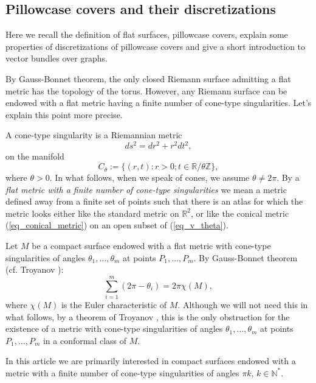 \documentclass[12pt]{article}
\numberwithin{equation}{section}
\theoremstyle{theorem}
\theoremstyle{definition}
\theoremstyle{remark}
\newcommand{\real}{\mathbb{R}}
\newcommand{\nat}{\mathbb{N}}
\newcommand{\integ}{\mathbb{Z}}
\begin{document}
		\subsection{Pillowcase covers and their discretizations}\label{sect_sq_t_s_disc}
	\par Here we recall the definition of flat surfaces, pillowcase covers, explain some properties of discretizations of pillowcase covers and give a short introduction to vector bundles over graphs.
	\par 
	By Gauss-Bonnet theorem, the only closed Riemann surface admitting a flat metric has the topology of the torus. 
	However, any Riemann surface can be endowed with a flat metric having a finite number of cone-type singularities. 
	Let's explain this point more precise.
	\par 
	A cone-type singularity is a Riemannian metric
	\begin{equation}\label{eq_conical_metric}
		ds^2 = dr^2 + r^2 dt^2,
	\end{equation}
	on the manifold
	\begin{equation}\label{eq_v_theta}
		C_{\theta} := \{(r, t) : r > 0; t \in \real / \theta \integ \},
	\end{equation}
	where $\theta > 0$.
	In what follows, when we speak of cones, we assume $\theta \neq 2\pi$.
	By a \textit{flat metric with a finite number of cone-type singularities} we mean a metric defined away from a finite set of points such that there is an atlas for which the metric looks either like the standard metric on $\real^2$, or like the conical metric (\ref{eq_conical_metric}) on an open subset of (\ref{eq_v_theta}).
	\par 
	Let $M$ be a compact surface endowed with a flat metric with cone-type singularities of angles $\theta_1, \ldots, \theta_m$ at points  $P_1, \ldots, P_m$. 
	By Gauss-Bonnet theorem (cf. Troyanov \cite[Proposition 3]{Troyanov}):
	\begin{equation}\label{eq_gauss_bonnet}
		\sum_{i = 1}^{m} (2\pi - \theta_i) = 2 \pi \chi(M),
	\end{equation}
	where $\chi(M)$ is the Euler characteristic of $M$. 
	Although we will not need this in what follows, by a theorem of Troyanov \cite[Théorème, \S 5]{Troyanov}, this is the only obstruction for the existence of a metric with cone-type singularities of angles $\theta_1, \ldots, \theta_m$ at points  $P_1, \ldots, P_m$ in a conformal class of $M$.
	\par 
 	In this article we are primarily interested in compact surfaces endowed with a metric with a finite number of cone-type singularities of angles $\pi k$, $k \in \nat^*$. 
\end{document}
